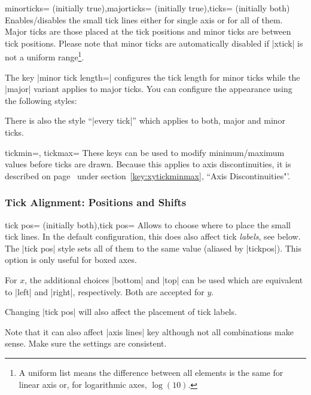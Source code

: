 \begin{pgfplotsxykeylist}{\x minorticks= (initially true),\x majorticks= (initially true),ticks= (initially both)}
Enables/disables the small tick lines either for single axis or for all of them. Major ticks are those placed at the tick positions and minor ticks are between tick positions. Please note that minor ticks are automatically disabled if |xtick| is not a uniform range\footnote{A uniform list means the difference between all elements is the same for linear axis or, for logarithmic axes, $\log(10)$.}.

The key |minor tick length=| configures the tick length for minor ticks while the |major| variant applies to major ticks.
You can configure the appearance using the following styles:
\begin{codeexample}
\end{codeexample}
There is also the style ``|every tick|'' which applies to both, major and minor ticks.
\end{pgfplotsxykeylist}

\begin{pgfplotsxykeylist}{\x tickmin=, \x tickmax=}
	These keys can be used to modify minimum/maximum values before ticks are drawn. Because this applies to axis discontinuities, it is described on page~\pageref{key:xytickminmax} under section~\ref{key:xytickminmax}, ``Axis Discontinuities"'.
\end{pgfplotsxykeylist}

\subsubsection{Tick Alignment: Positions and Shifts}

\begin{pgfplotsxykeylist}{\x tick pos= (initially both),tick pos=}
Allows to choose where to place the small tick lines. In the default configuration, this does also affect tick \emph{labels}, see below. The |tick pos| style sets all of them to the same value (aliased by |tickpos|). This option is only useful for boxed axes.

For $x$, the additional choices |bottom| and |top| can be used which are equivalent to |left| and |right|, respectively. Both are accepted for $y$.

Changing |tick pos| will also affect the placement of tick labels. 

Note that it can also affect |axis lines| key although not all combinations make sense. Make sure the settings are consistent.
\end{pgfplotsxykeylist}

